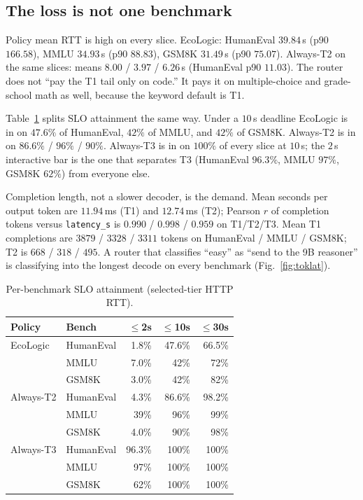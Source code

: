 \documentclass[10pt,conference]{IEEEtran}
\begin{document}
\subsection{The loss is not one benchmark}
Policy mean RTT is high on every slice. EcoLogic: HumanEval $39.84$\,s (p90 $166.58$), MMLU $34.93$\,s (p90 $88.83$), GSM8K $31.49$\,s (p90 $75.07$). Always-T2 on the same slices: means $8.00$ / $3.97$ / $6.26$\,s (HumanEval p90 $11.03$). The router does not ``pay the T1 tail only on code.'' It pays it on multiple-choice and grade-school math as well, because the keyword default is T1.

Table~\ref{tab:slo_bench} splits SLO attainment the same way. Under a $10$\,s deadline EcoLogic is in on $47.6\%$ of HumanEval, $42\%$ of MMLU, and $42\%$ of GSM8K. Always-T2 is in on $86.6\%$ / $96\%$ / $90\%$. Always-T3 is in on $100\%$ of every slice at $10$\,s; the $2$\,s interactive bar is the one that separates T3 (HumanEval $96.3\%$, MMLU $97\%$, GSM8K $62\%$) from everyone else.

Completion length, not a slower decoder, is the demand. Mean seconds per output token are $11.94$\,ms (T1) and $12.74$\,ms (T2); Pearson $r$ of completion tokens versus \texttt{latency\_s} is $0.990$ / $0.998$ / $0.959$ on T1/T2/T3. Mean T1 completions are $3879$ / $3328$ / $3311$ tokens on HumanEval / MMLU / GSM8K; T2 is $668$ / $318$ / $495$. A router that classifies ``easy'' as ``send to the 9B reasoner'' is classifying into the longest decode on every benchmark (Fig.~\ref{fig:toklat}).

\begin{table}[t]
\centering
\caption{Per-benchmark SLO attainment (selected-tier HTTP RTT).}
\label{tab:slo_bench}
\setlength{\tabcolsep}{3.2pt}
\begin{tabular}{@{}llrrr@{}}
\toprule
Policy & Bench & $\le$2s & $\le$10s & $\le$30s \\
\midrule
EcoLogic & HumanEval & 1.8\% & 47.6\% & 66.5\% \\
         & MMLU & 7.0\% & 42\% & 72\% \\
         & GSM8K & 3.0\% & 42\% & 82\% \\
Always-T2 & HumanEval & 4.3\% & 86.6\% & 98.2\% \\
          & MMLU & 39\% & 96\% & 99\% \\
          & GSM8K & 4.0\% & 90\% & 98\% \\
Always-T3 & HumanEval & 96.3\% & 100\% & 100\% \\
          & MMLU & 97\% & 100\% & 100\% \\
          & GSM8K & 62\% & 100\% & 100\% \\
\bottomrule
\end{tabular}
\end{table}
\end{document}
